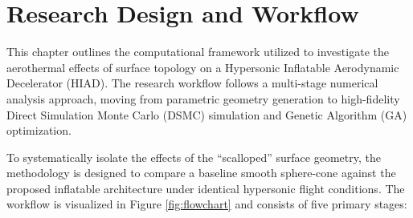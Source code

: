 \section{Research Design and Workflow}
This chapter outlines the computational framework utilized to investigate the aerothermal effects of surface topology on a Hypersonic Inflatable Aerodynamic Decelerator (HIAD). The research workflow follows a multi-stage numerical analysis approach, moving from parametric geometry generation to high-fidelity Direct Simulation Monte Carlo (DSMC) simulation and Genetic Algorithm (GA) optimization.

To systematically isolate the effects of the ``scalloped'' surface geometry, the methodology is designed to compare a baseline smooth sphere-cone against the proposed inflatable architecture under identical hypersonic flight conditions. The workflow is visualized in Figure \ref{fig:flowchart} and consists of five primary stages:

